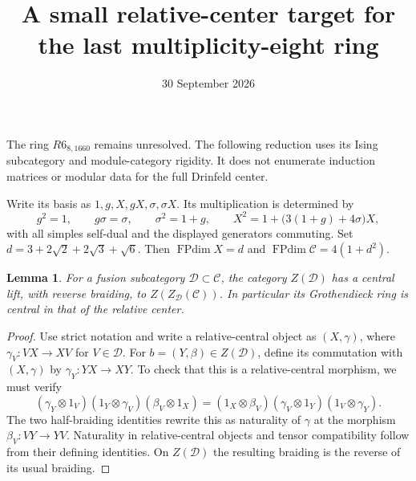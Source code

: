 \documentclass[11pt]{article}
\title{A small relative-center target for the last multiplicity-eight ring}
\author{}\date{30 September 2026}
\newtheorem{lemma}{Lemma}
\newcommand{\FPdim}{\operatorname{FPdim}}
\begin{document}
\maketitle
The ring $R6_{8,1660}$ remains unresolved. The following reduction uses its
Ising subcategory and module-category rigidity. It does not enumerate induction
matrices or modular data for the full Drinfeld center.

Write its basis as $1,g,X,gX,\sigma,\sigma X$. Its multiplication is determined by
\[
 g^2=1,\qquad g\sigma=\sigma,\qquad \sigma^2=1+g,\qquad
 X^2=1+\bigl(3(1+g)+4\sigma\bigr)X,
\]
with all simples self-dual and the displayed generators commuting.
Set $d=3+2\sqrt2+2\sqrt3+\sqrt6$. Then
$\FPdim X=d$ and $\FPdim\mathcal C=4(1+d^2)$.

\begin{lemma}
For a fusion subcategory $\mathcal D\subset\mathcal C$, the category
$Z(\mathcal D)$ has a central lift, with reverse braiding, to
$Z(Z_{\mathcal D}(\mathcal C))$. In particular its Grothendieck ring
is central in that of the relative center.
\end{lemma}
\begin{proof}
Use strict notation and write a relative-central object as $(X,\gamma)$,
where $\gamma_V:VX\to XV$ for $V\in\mathcal D$. For
$b=(Y,\beta)\in Z(\mathcal D)$, define its commutation with $(X,\gamma)$
by $\gamma_Y:YX\to XY$. To check that this is a relative-central morphism,
we must verify
\[
 (\gamma_Y\otimes1_V)(1_Y\otimes\gamma_V)(\beta_V\otimes1_X)
 =(1_X\otimes\beta_V)(\gamma_V\otimes1_Y)(1_V\otimes\gamma_Y).
\]
The two half-braiding identities rewrite this as naturality of $\gamma$
at the morphism $\beta_V:VY\to YV$. Naturality in relative-central objects
and tensor compatibility follow from their defining identities. On
$Z(\mathcal D)$ the resulting braiding is the reverse of its usual braiding.
\end{proof}
\end{document}
